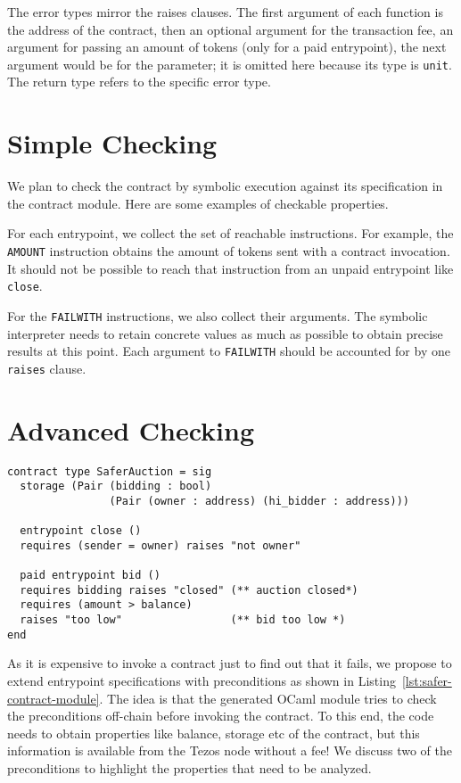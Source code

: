 \documentclass[a4paper,USenglish,american,cleveref, autoref, thm-restate]{oasics-v2021}
\begin{document}
The error types mirror the raises clauses. The first argument of each
function is the address of the contract, then an optional argument for
the transaction fee, an argument for passing an amount of tokens
(only for a paid entrypoint), the next argument would be for
the parameter; it is omitted here because its type is
\lstinline/unit/. The return type refers to the specific error type.

\section{Simple Checking}
\label{sec:check-contr-against}

We plan to check the contract by symbolic execution against its
specification in the contract module. Here are some examples of
checkable properties.

For each entrypoint, we collect the set of reachable instructions.
For example, the  \lstinline/AMOUNT/ instruction obtains the amount of
tokens sent with a contract invocation.
It should not be possible to reach that instruction from an unpaid
entrypoint  like \lstinline/close/.

For the \lstinline/FAILWITH/ instructions, we also collect their
arguments. The symbolic interpreter needs to retain concrete values as
much as possible to obtain precise results at this point. Each
argument to \lstinline/FAILWITH/ should be accounted for by one
\lstinline/raises/ clause.

\section{Advanced Checking}
\label{sec:advanced-checking}
\begin{lstlisting}[float,captionpos=b,caption={Safer contract module},label={lst:safer-contract-module}]
contract type SaferAuction = sig
  storage (Pair (bidding : bool) 
                (Pair (owner : address) (hi_bidder : address)))

  entrypoint close ()
  requires (sender = owner) raises "not owner"

  paid entrypoint bid () 
  requires bidding raises "closed" (** auction closed*)
  requires (amount > balance)
  raises "too low"                 (** bid too low *)
end
\end{lstlisting}

As it is expensive to invoke a contract just to find out that it
fails, we propose to extend entrypoint specifications with
preconditions as shown in Listing~\ref{lst:safer-contract-module}. The
idea is that the generated OCaml module tries to check the
preconditions off-chain before invoking the contract. To this end, the
code needs to obtain properties like balance, storage etc of the
contract, but this information is available from the Tezos node without a fee!
We discuss two of the preconditions to highlight the properties that 
need to be analyzed. 
\end{document}
